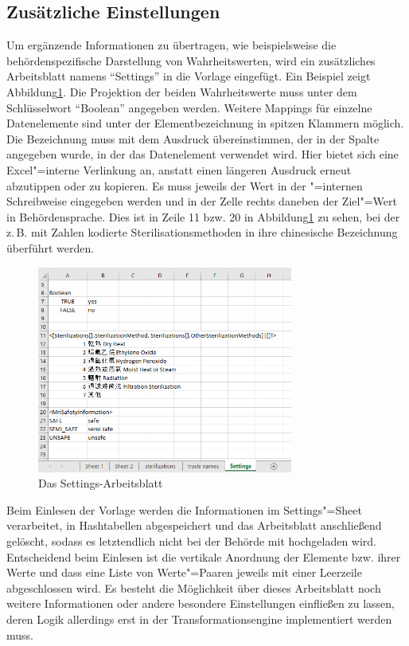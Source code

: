 \subsection{Zusätzliche Einstellungen} \label{zM}

Um ergänzende Informationen zu übertragen, wie beispielsweise die behördenspezifische Darstellung von Wahrheitswerten, wird ein zusätzliches Arbeitsblatt namens "`Settings"' in die Vorlage eingefügt. Ein Beispiel zeigt Abbildung\nbs\ref{fig:jms2}. Die Projektion der beiden Wahrheitswerte muss unter dem Schlüsselwort "`Boolean"' angegeben werden. Weitere Mappings für einzelne Datenelemente sind unter der Elementbezeichnung in spitzen Klammern möglich. Die Bezeichnung muss mit dem Ausdruck übereinstimmen, der in der Spalte angegeben wurde, in der das Datenelement verwendet wird. Hier bietet sich eine Excel"=interne Verlinkung an, anstatt einen längeren Ausdruck erneut abzutippen oder zu kopieren. Es muss jeweils der Wert in der "=internen Schreibweise eingegeben werden und in der Zelle rechts daneben der Ziel"=Wert in Behördensprache. Dies ist in Zeile 11 bzw. 20 in Abbildung\nbs\ref{fig:jms2} zu sehen, bei der z.\,B. mit Zahlen kodierte Sterilisationsmethoden in ihre chinesische Bezeichnung überführt werden.

\begin{figure}[htb]
 \centering
 \includegraphics[width=0.75\textwidth]{Bilder/JMESPath2}
 \caption[Das Settings-Arbeitsblatt aus Ansatz\nbs\ref{ED}]{Das Settings-Arbeitsblatt}
 \label{fig:jms2}
\end{figure}
Beim Einlesen der Vorlage werden die Informationen im Settings"=Sheet verarbeitet, in Hashtabellen abgespeichert und das Arbeitsblatt anschließend gelöscht, sodass es letztendlich nicht bei der Behörde mit hochgeladen wird. Entscheidend beim Einlesen ist die vertikale Anordnung der Elemente bzw. ihrer Werte und dass eine Liste von Werte"=Paaren jeweils mit einer Leerzeile abgeschlossen wird.
Es besteht die Möglichkeit über dieses Arbeitsblatt noch weitere Informationen oder andere besondere Einstellungen einfließen zu lassen, deren Logik allerdings erst in der Transformationsengine implementiert werden muss. 

